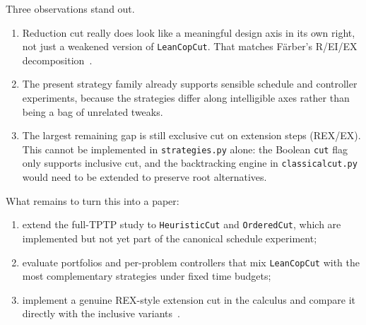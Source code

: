 \documentclass[11pt,twocolumn]{article}
\newcommand{\citen}[1]{~\parencite{#1}}
\begin{document}
Three observations stand out.

\begin{enumerate}[itemsep=2pt]
\item Reduction cut really does look like a meaningful design axis in its own right, not just a weakened version of \texttt{LeanCopCut}. That matches Färber's R/EI/EX decomposition\citen{farberCuriouslyEffectiveBacktracking2024}.
	\item The present strategy family already supports sensible schedule and controller experiments, because the strategies differ along intelligible axes rather than being a bag of unrelated tweaks.
	\item The largest remaining gap is still exclusive cut on extension steps (REX/EX). This cannot be implemented in \texttt{strategies.py} alone: the Boolean \texttt{cut} flag only supports inclusive cut, and the backtracking engine in \texttt{classicalcut.py} would need to be extended to preserve root alternatives.
\end{enumerate}

What remains to turn this into a paper:

\begin{enumerate}[itemsep=2pt]
	\item extend the full-TPTP study to \texttt{HeuristicCut} and \texttt{OrderedCut}, which are implemented but not yet part of the canonical schedule experiment;
	\item evaluate portfolios and per-problem controllers that mix \texttt{LeanCopCut} with the most complementary strategies under fixed time budgets;
	\item implement a genuine REX-style extension cut in the calculus and compare it directly with the inclusive variants\citen{farberCuriouslyEffectiveBacktracking2024}.
\end{enumerate}

\renewcommand*{\bibfont}{\small}
\printbibliography{}
\end{document}
